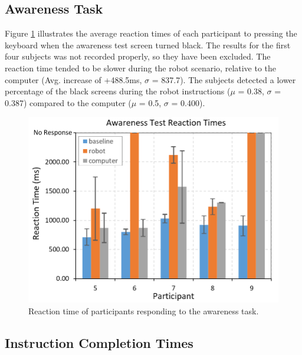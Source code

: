 \documentclass[conference]{IEEEtran}
\begin{document}
\subsection{Awareness Task}
Figure \ref{fig:awareness_reaction} illustrates the average reaction times of each participant to pressing the keyboard when the awareness test screen turned black. The results for the first four subjects was not recorded properly, so they have been excluded. The reaction time tended to be slower during the robot scenario, relative to the computer (Avg. increase of +488.5ms, $\sigma$ = 837.7). The subjects detected a lower percentage of the black screens during the robot instructions ($\mu$ = 0.38, $\sigma$  = 0.387) compared to the computer ($\mu$ = 0.5, $\sigma$  = 0.400).

\begin{figure}[h]
	\flushleft 
	\includegraphics[width=1\linewidth]{figures/awareness_reactions.png}
	\caption{\label{fig:awareness_reaction}Reaction time of participants responding to the awareness task.}  
\end{figure}

\subsection{Instruction Completion Times}
\end{document}
